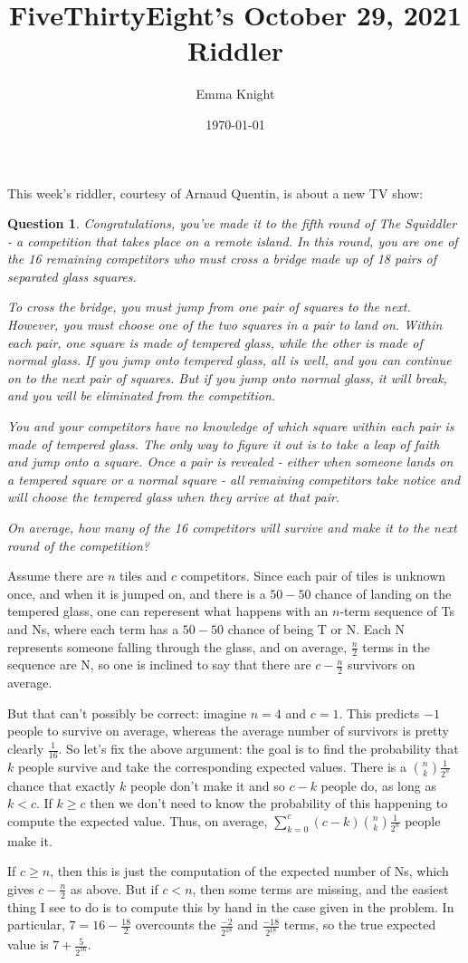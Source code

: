 \documentclass[11pt]{article}
\title{FiveThirtyEight's October 29, 2021 Riddler}
\author{Emma Knight}
\date{\today}
\newtheorem{question}[theorem]{Question}
\theoremstyle{definition}
\begin{document}
\maketitle
This week's riddler, courtesy of Arnaud Quentin, is about a new TV show:
\begin{question}
Congratulations, you’ve made it to the fifth round of The Squiddler - a competition that takes place on a remote island. In this round, you are one of the 16 remaining competitors who must cross a bridge made up of 18 pairs of separated glass squares.

To cross the bridge, you must jump from one pair of squares to the next. However, you must choose one of the two squares in a pair to land on. Within each pair, one square is made of tempered glass, while the other is made of normal glass. If you jump onto tempered glass, all is well, and you can continue on to the next pair of squares. But if you jump onto normal glass, it will break, and you will be eliminated from the competition.

You and your competitors have no knowledge of which square within each pair is made of tempered glass. The only way to figure it out is to take a leap of faith and jump onto a square. Once a pair is revealed - either when someone lands on a tempered square or a normal square - all remaining competitors take notice and will choose the tempered glass when they arrive at that pair.

On average, how many of the 16 competitors will survive and make it to the next round of the competition?
\end{question}

Assume there are $n$ tiles and $c$ competitors.  Since each pair of tiles is unknown once, and when it is jumped on, and there is a $50-50$ chance of landing on the tempered glass, one can reperesent what happens with an $n$-term sequence of Ts and Ns, where each term has a $50-50$ chance of being T or N.  Each N represents someone falling through the glass, and on average, $\frac{n}{2}$ terms in the sequence are N, so one is inclined to say that there are $c-\frac{n}{2}$ survivors on average.

But that can't possibly be correct: imagine $n = 4$ and $c = 1$.  This predicts $-1$ people to survive on average, whereas the average number of survivors is pretty clearly $\frac{1}{16}$.  So let's fix the above argument: the goal is to find the probability that $k$ people survive and take the corresponding expected values. There is a $\binom{n}{k}\frac{1}{2^n}$ chance that exactly $k$ people don't make it and so $c-k$ people do, as long as $k < c$.  If $k \geq c$ then we don't need to know the probability of this happening to compute the expected value.  Thus, on average, $\displaystyle{\sum_{k = 0}^c (c-k)\binom{n}{k}\frac{1}{2^n}}$ people make it.

If $c \geq n$, then this is just the computation of the expected number of Ns, which gives $c - \frac{n}{2}$ as above.  But if $c < n$, then some terms are missing, and the easiest thing I see to do is to compute this by hand in the case given in the problem.  In particular, $7 = 16 - \frac{18}{2}$ overcounts the $\frac{-2}{2^{18}}$ and $\frac{-18}{2^{18}}$ terms, so the true expected value is $7 + \frac{5}{2^{16}}$.
\end{document}
